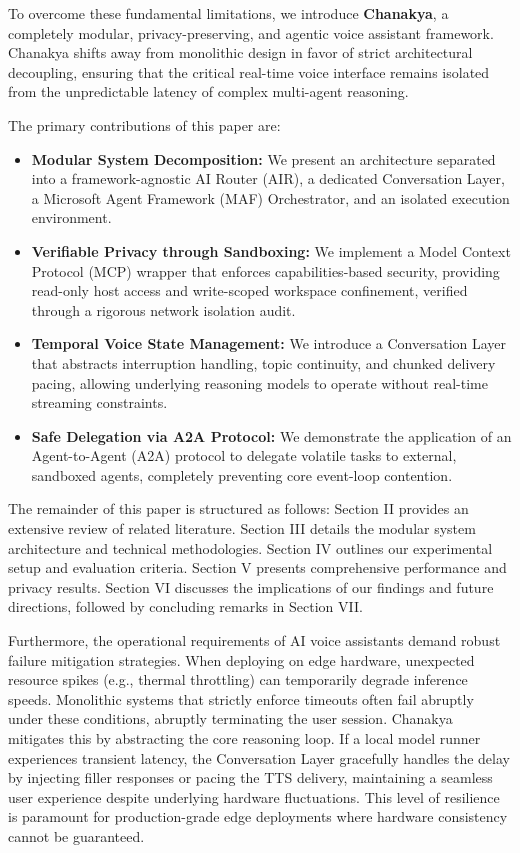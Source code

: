 \documentclass[conference]{IEEEtran}
\begin{document}
To overcome these fundamental limitations, we introduce \textbf{Chanakya}, a completely modular, privacy-preserving, and agentic voice assistant framework. Chanakya shifts away from monolithic design in favor of strict architectural decoupling, ensuring that the critical real-time voice interface remains isolated from the unpredictable latency of complex multi-agent reasoning.

The primary contributions of this paper are:
\begin{itemize}
    \item \textbf{Modular System Decomposition:} We present an architecture separated into a framework-agnostic AI Router (AIR), a dedicated Conversation Layer, a Microsoft Agent Framework (MAF) Orchestrator, and an isolated execution environment.
    \item \textbf{Verifiable Privacy through Sandboxing:} We implement a Model Context Protocol (MCP) \cite{mcp2024} wrapper that enforces capabilities-based security, providing read-only host access and write-scoped workspace confinement, verified through a rigorous network isolation audit.
    \item \textbf{Temporal Voice State Management:} We introduce a Conversation Layer that abstracts interruption handling, topic continuity, and chunked delivery pacing, allowing underlying reasoning models to operate without real-time streaming constraints.
    \item \textbf{Safe Delegation via A2A Protocol:} We demonstrate the application of an Agent-to-Agent (A2A) protocol to delegate volatile tasks to external, sandboxed agents, completely preventing core event-loop contention.
\end{itemize}

The remainder of this paper is structured as follows: Section II provides an extensive review of related literature. Section III details the modular system architecture and technical methodologies. Section IV outlines our experimental setup and evaluation criteria. Section V presents comprehensive performance and privacy results. Section VI discusses the implications of our findings and future directions, followed by concluding remarks in Section VII.



Furthermore, the operational requirements of AI voice assistants demand robust failure mitigation strategies. When deploying on edge hardware, unexpected resource spikes (e.g., thermal throttling) can temporarily degrade inference speeds. Monolithic systems that strictly enforce timeouts often fail abruptly under these conditions, abruptly terminating the user session. Chanakya mitigates this by abstracting the core reasoning loop. If a local model runner experiences transient latency, the Conversation Layer gracefully handles the delay by injecting filler responses or pacing the TTS delivery, maintaining a seamless user experience despite underlying hardware fluctuations. This level of resilience is paramount for production-grade edge deployments where hardware consistency cannot be guaranteed.
\end{document}
